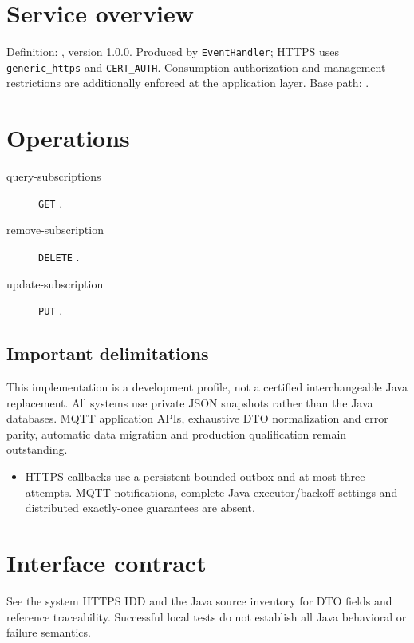 \documentclass[a4paper]{arrowhead}
\begin{document}
\ArrowheadSetup
\section{Service overview}
Definition: , version 1.0.0. Produced by \texttt{EventHandler}; HTTPS uses \texttt{generic\_https} and \texttt{CERT\_AUTH}. Consumption authorization and management restrictions are additionally enforced at the application layer. Base path: .
\section{Operations}
\begin{description}
\item[query-subscriptions] \texttt{GET} .
\item[remove-subscription] \texttt{DELETE} .
\item[update-subscription] \texttt{PUT} .
\end{description}
\subsection{Important delimitations}
This implementation is a development profile, not a certified interchangeable Java replacement. All systems use private JSON snapshots rather than the Java databases. MQTT application APIs, exhaustive DTO normalization and error parity, automatic data migration and production qualification remain outstanding.
\begin{itemize}
\item HTTPS callbacks use a persistent bounded outbox and at most three attempts. MQTT notifications, complete Java executor/backoff settings and distributed exactly-once guarantees are absent.
\end{itemize}
\section{Interface contract}
See the system HTTPS IDD and the Java source inventory for DTO fields and reference traceability. Successful local tests do not establish all Java behavioral or failure semantics.
\end{document}
